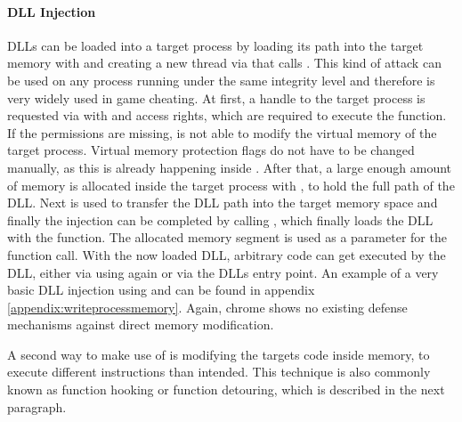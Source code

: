 \paragraph{ DLL Injection}
DLLs can be loaded into a target process by loading its path into the target memory with  and creating a new thread via  that calls . This kind of attack can be used on any process running under the same integrity level and therefore is very widely used in game cheating. At first, a handle to the target process is requested via  with  and  access rights, which are required to execute the  function. If the permissions are missing,  is not able to modify the virtual memory of the target process. Virtual memory protection flags do not have to be changed manually, as this is already happening inside . After that, a large enough amount of memory is allocated inside the target process with , to hold the full path of the DLL. Next  is used to transfer the DLL path into the target memory space and finally the injection can be completed by calling , which finally loads the DLL with the  function. The allocated memory segment is used as a parameter for the  function call. With the now loaded DLL, arbitrary code can get executed by the DLL, either via using  again or via the DLLs entry point.
An example of a very basic DLL injection using  and  can be found in appendix \ref{appendix:writeprocessmemory}. Again, chrome shows no existing defense mechanisms against direct memory modification.

A second way to make use of  is modifying the targets code inside memory, to execute different instructions than intended. This technique is also commonly known as function hooking or function detouring, which is described in the next paragraph. 
